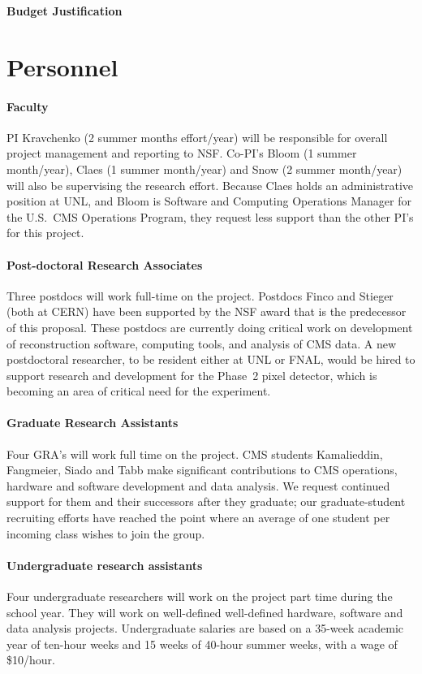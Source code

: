 \documentclass[11pt]{article}
\begin{document}
\begin{center}
{\Large \bf Budget Justification}\\
\end{center}

\section{Personnel} 

\paragraph{Faculty} PI Kravchenko (2 summer months effort/year) will be
responsible for overall project management and reporting to NSF.  Co-PI's
Bloom (1 summer month/year), Claes (1 summer month/year) and Snow (2 summer
month/year) will also be supervising the research effort.  Because Claes
holds an administrative position at UNL, and Bloom is Software and
Computing Operations Manager for the U.S.~CMS Operations Program, they
request less support than the other PI's for this project.

\paragraph{Post-doctoral Research Associates} Three postdocs will work
full-time on the project.  Postdocs Finco and Stieger (both at CERN) have
been supported by the NSF award that is the predecessor of this proposal.
These postdocs are currently doing critical work on development of
reconstruction software, computing tools, and analysis of CMS data.  A new
postdoctoral researcher, to be resident either at UNL or FNAL, would be
hired to support research and development for the Phase~2 pixel detector,
which is becoming an area of critical need for the experiment.

\paragraph{Graduate Research Assistants} Four GRA's will work full time on
the project.  CMS students Kamalieddin, Fangmeier, Siado and Tabb make
significant contributions to CMS operations, hardware and software
development and data analysis.  We request continued support for them and
their successors after they graduate; our graduate-student recruiting
efforts have reached the point where an average of one student per incoming
class wishes to join the group.

\paragraph{Undergraduate research assistants} Four undergraduate
researchers will work on the project part time during the school year.  They
will work on well-defined well-defined hardware, software and data analysis
projects.  Undergraduate salaries are based on a 35-week academic year of ten-hour weeks and 15 weeks of 40-hour summer weeks, with a wage of \$10/hour.
\end{document}
